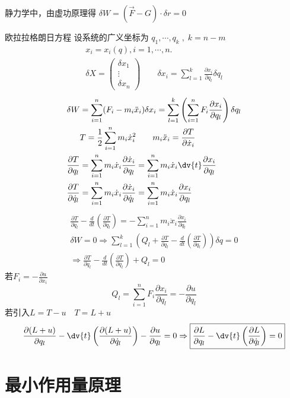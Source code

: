 \documentclass[12pt, a4paper, oneside, UTF8]{ctexbook}  %
\newcommand{\pa}{\partial}
\begin{document}
静力学中，由虚功原理得
\(\delta W =(\vec{F}-G)\cdot \delta r =0\)
\begin{thm}
    欧拉\textminus 拉格朗日方程
\noindent
设系统的广义坐标为 \( q_1, \cdots, q_k \;,\; k = n-m\)
\begin{gather*}
    x_i = x_i(q), i=1,\cdots,n.
\\
\delta X = \begin{pmatrix}
\delta x_{1} \\
\vdots \\
\delta x_{n}
\end{pmatrix} \qquad 
\delta x_i = \sum_{l=1}^{k} \frac{\partial x_{i}}{\partial q_{l}} \delta q_{l}
\end{gather*}
\begin{align*}
\delta W &= \sum_{i=1}^n (F_i - m_i \ddot{x}_i) \delta x_i
= \sum_{l=1}^k  \left( \sum_{i=1}^n F_i \frac{\partial x_i}{\partial q_l} \right) \delta q_l
\\
&T = \frac{1}{2} \sum_{i=1}^{n} m_{i} \dot{x}_{i}^{2}
\qquad m_{i} \ddot{x}_{i} = \frac{\partial T}{\partial \dot{x}_{i}}
\\
\frac{\partial T}{\partial q_l} &= \sum_{i=1}^{n} m_{i} \dot{x}_{i} 
\frac{\partial \dot{x}_{i}}{\partial q_l} 
= \sum_{i=1}^{n} m_i \dot{x}_{i} \dv{t}
\frac{\partial x_{i}}{\partial q_l}
\\
\frac{\partial T}{\partial \dot{q}_l} &= \sum_{i=1}^{n} m_{i} \dot{x}_{i} 
\frac{\partial \dot{x}_{i}}{\partial \dot{q}_l} 
= \sum_{i=1}^{n} m_i \dot{x}_{i}
\frac{\partial x_{i}}{\partial q_l}
\end{align*}
\begin{gather*}
\frac{\partial T}{\partial q_l} - \frac{d}{dt} \left( \frac{\partial T}{\partial \dot{q}_l} \right) 
= -\sum_{i=1}^{n} m_{i} \ddot{x}_{i} \frac{\partial x_{i}}{\partial q_l}\\
\delta W=0 \Rightarrow
\sum_{l=1}^{k} \left( Q_{l} + \frac{\partial T}{\partial q_{l}} 
- \frac{d}{dt} \left( \frac{\partial T}{\partial \dot{q}_{l}} \right) \right) \delta q = 0
\\
\Rightarrow \boxed{\frac{\partial T}{\partial \dot{q}_{l}} - \frac{d}{dt} 
\left( \frac{\pa T}{\partial \dot{q}_l} \right) + Q_l = 0}
\end{gather*}
若\(F_i=-\frac{\pa u}{\pa x_i}\)
    \[Q_l=\sum_{i=1}^{n}F_i \frac{\pa x_i}{\pa q_l}=-\frac{\pa u}{\pa q_l}
    \]
若引入\(L=T-u \quad T=L+u\)
\[\frac{\pa (L+u)}{\pa q_l}-\dv{t}\left(\frac{\pa (L+u)}{\pa \dot{q}_l}\right)
-\frac{\pa u}{\pa q_l}=0
\Rightarrow \boxed{\frac{\pa L}{\pa q_l}
-\dv{t}\left(\frac{\pa L}{\pa \dot{q}_l}\right)=0}\]
\end{thm}
\section{最小作用量原理}





















\ifx\allfiles\undefined
\end{document}
